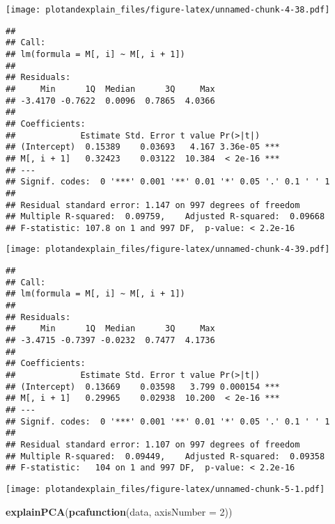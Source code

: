 \documentclass[]{article}
\newenvironment{Shaded}{\begin{snugshade}}{\end{snugshade}}
\newcommand{\DataTypeTok}[1]{\textcolor[rgb]{0.13,0.29,0.53}{#1}}
\newcommand{\DecValTok}[1]{\textcolor[rgb]{0.00,0.00,0.81}{#1}}
\newcommand{\KeywordTok}[1]{\textcolor[rgb]{0.13,0.29,0.53}{\textbf{#1}}}
\newcommand{\NormalTok}[1]{#1}
\newcommand{\OperatorTok}[1]{\textcolor[rgb]{0.81,0.36,0.00}{\textbf{#1}}}
\newcommand{\StringTok}[1]{\textcolor[rgb]{0.31,0.60,0.02}{#1}}
\begin{document}
\texttt{[image: plotandexplain\_files/figure-latex/unnamed-chunk-4-38.pdf]}

\begin{verbatim}
## 
## Call:
## lm(formula = M[, i] ~ M[, i + 1])
## 
## Residuals:
##     Min      1Q  Median      3Q     Max 
## -3.4170 -0.7622  0.0096  0.7865  4.0366 
## 
## Coefficients:
##             Estimate Std. Error t value Pr(>|t|)    
## (Intercept)  0.15389    0.03693   4.167 3.36e-05 ***
## M[, i + 1]   0.32423    0.03122  10.384  < 2e-16 ***
## ---
## Signif. codes:  0 '***' 0.001 '**' 0.01 '*' 0.05 '.' 0.1 ' ' 1
## 
## Residual standard error: 1.147 on 997 degrees of freedom
## Multiple R-squared:  0.09759,    Adjusted R-squared:  0.09668 
## F-statistic: 107.8 on 1 and 997 DF,  p-value: < 2.2e-16
\end{verbatim}

\texttt{[image: plotandexplain\_files/figure-latex/unnamed-chunk-4-39.pdf]}

\begin{verbatim}
## 
## Call:
## lm(formula = M[, i] ~ M[, i + 1])
## 
## Residuals:
##     Min      1Q  Median      3Q     Max 
## -3.4715 -0.7397 -0.0232  0.7477  4.1736 
## 
## Coefficients:
##             Estimate Std. Error t value Pr(>|t|)    
## (Intercept)  0.13669    0.03598   3.799 0.000154 ***
## M[, i + 1]   0.29965    0.02938  10.200  < 2e-16 ***
## ---
## Signif. codes:  0 '***' 0.001 '**' 0.01 '*' 0.05 '.' 0.1 ' ' 1
## 
## Residual standard error: 1.107 on 997 degrees of freedom
## Multiple R-squared:  0.09449,    Adjusted R-squared:  0.09358 
## F-statistic:   104 on 1 and 997 DF,  p-value: < 2.2e-16
\end{verbatim}

\begin{Shaded}
\end{Shaded}

\texttt{[image: plotandexplain\_files/figure-latex/unnamed-chunk-5-1.pdf]}

\begin{Shaded}
\begin{Highlighting}[]
\KeywordTok{explainPCA}\NormalTok{(}\KeywordTok{pcafunction}\NormalTok{(data, }\DataTypeTok{axisNumber =} \DecValTok{2}\NormalTok{))}
\end{Highlighting}
\end{Shaded}
\end{document}
